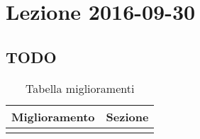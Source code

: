 \section{Lezione 2016-09-30}
\subsection{TODO}
\begin{table}[ht]
\begin{center}
\begin{tabular}{|p{\textwidth}|c|}
\hline
\multicolumn{1}{|c|}{\textbf{Miglioramento}} & \textbf{Sezione} \\ \hline
& \\ \hline
\end{tabular}
\end{center}
\caption{Tabella miglioramenti}
\label{tab:tab_todo}
\end{table}
